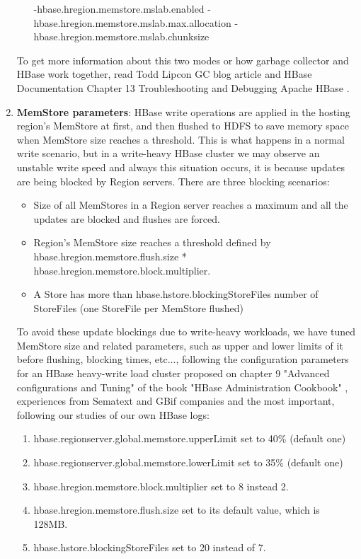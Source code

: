 \begin{enumerate}
\begin{enumerate}
\par
{}
-hbase.hregion.memstore.mslab.enabled	
-hbase.hregion.memstore.mslab.max.allocation
-hbase.hregion.memstore.mslab.chunksize
\end{enumerate}


To get more information about this two modes or how garbage collector and HBase work together, read Todd Lipcon GC blog article \cite{MSLABexplained} and HBase Documentation Chapter 13 Troubleshooting and Debugging Apache HBase \cite{ApacheHBaseLogs}.

\item \textbf{MemStore parameters}:
\bigskip
HBase write operations are applied in the hosting region's MemStore at first, and then flushed to HDFS to save memory space when MemStore size reaches a threshold. This is what happens in a normal write scenario, but in a write-heavy HBase cluster we may observe an unstable write speed and always this situation occurs, it is because updates are being blocked by Region servers. There are three blocking scenarios:
\begin{itemize}
\item Size of all MemStores in a Region server reaches a maximum and all the updates are blocked and flushes are forced.
\item Region's MemStore size reaches a threshold defined by hbase.hregion.memstore.flush.size * hbase.hregion.memstore.block.multiplier.
\item A Store has more than hbase.hstore.blockingStoreFiles number of StoreFiles (one StoreFile per MemStore flushed)
\end{itemize}

To avoid these update blockings due to write-heavy workloads, we have tuned MemStore size and related parameters, such as upper and lower limits of it before flushing, blocking times, etc..., following the configuration parameters for an HBase heavy-write load cluster  proposed on chapter 9 "Advanced configurations and Tuning" of the book "HBase Administration Cookbook" \cite{jiang2012hbase}, experiences from Sematext \cite{MemstoreSematext} and GBif companies \cite{MemstoreGBif} and the most important, following our studies of our own HBase logs:
\\
\begin{enumerate}
\item hbase.regionserver.global.memstore.upperLimit set to 40\% (default one)
\item hbase.regionserver.global.memstore.lowerLimit set to 35\% (default one)
\item hbase.hregion.memstore.block.multiplier set to 8 instead 2.
\item hbase.hregion.memstore.flush.size set to its default value, which is 128MB.
\item hbase.hstore.blockingStoreFiles set to 20 instead of 7.
\end{enumerate}


\end{enumerate}
